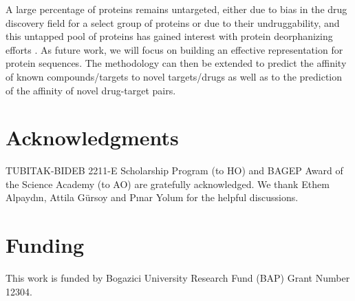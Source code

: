 \documentclass[11pt,letterpaper]{article}
\begin{document}
A large percentage of proteins remains untargeted, either due to bias in the drug discovery field for a select group of proteins or due to their undruggability, and this untapped pool of proteins has gained interest with protein deorphanizing efforts \cite{edwards2011too, o2016ligand,fedorov2010targeted}. As future work, we will focus on building an effective representation for protein sequences. The methodology can then be extended to predict the affinity of known compounds/targets to novel targets/drugs as well as to the prediction of the affinity of  novel drug-target pairs.





\section*{Acknowledgments}
TUBITAK-BIDEB 2211-E Scholarship Program (to HO) and BAGEP Award of the Science Academy (to AO) are gratefully acknowledged.  We thank Ethem Alpaydın, Attila Gürsoy and Pınar Yolum for the helpful discussions.\vspace*{-12pt}

\section*{Funding}

This work is funded by Bogazici University Research Fund (BAP) Grant Number 12304.

\nolinenumbers




\end{document}
